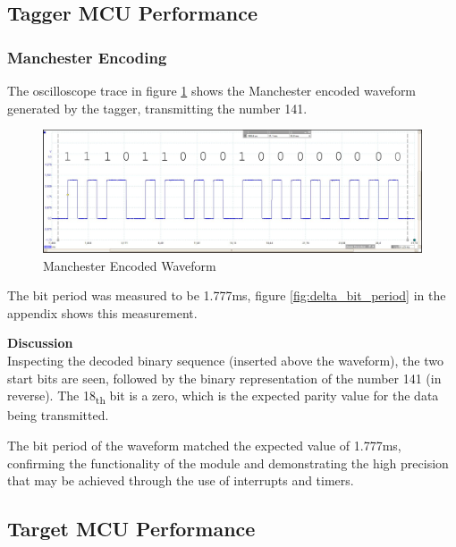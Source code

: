 


\subsection{Tagger MCU Performance}

\subsubsection{Manchester Encoding}
The oscilloscope trace in figure \ref{fig:manchester_sequence_141_decoded} shows the Manchester encoded waveform generated by the tagger, transmitting the number 141.

\begin{figure}[H]
	\centering
	\includegraphics[width=.9\textwidth]{figures/results/manchester/manchester_sequence_141_decoded.png}
	\caption{Manchester Encoded Waveform}
	\label{fig:manchester_sequence_141_decoded}
\end{figure}

The bit period was measured to be 1.777ms, figure \ref{fig:delta_bit_period} in the appendix shows this measurement.


\textbf{Discussion}\\
Inspecting the decoded binary sequence (inserted above the waveform), the two start bits are seen, followed by the binary representation of the number 141 (in reverse). The 18\textsubscript{th} bit is a zero, which is the expected parity value for the data being transmitted.

The bit period of the waveform matched the expected value of 1.777ms, confirming the functionality of the module and demonstrating the high precision that may be achieved through the use of interrupts and timers.






\subsection{Target MCU Performance}

